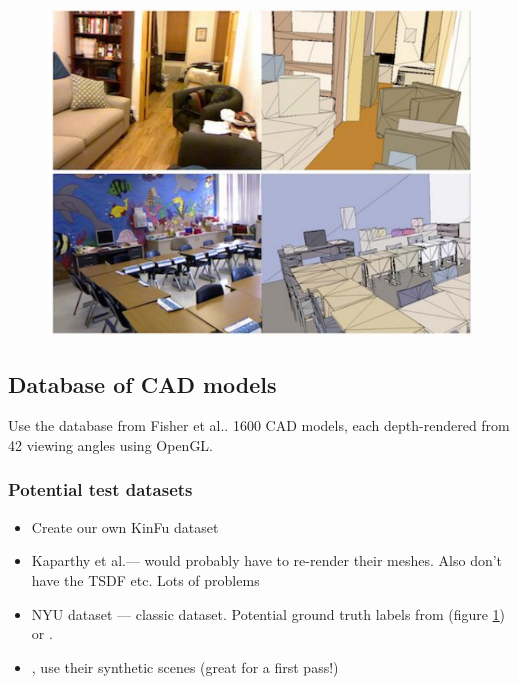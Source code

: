 \documentclass[10pt,twocolumn,letterpaper]{article}
\makeatletter
\newcommand*{\ea}{et al.\@\xspace}
\makeatother
\begin{document}
\begin{figure}
    \centering%
    \includegraphics[width=1.0\columnwidth]{guo.png}%
    \label{fig:guo_labels}%
\end{figure}



\subsection{Database of CAD models}
Use the database from Fisher \ea \cite{fisher-siggraphasia-2012}.
1600 CAD models, each depth-rendered from 42 viewing angles using OpenGL.

\subsubsection{Potential test datasets}
\begin{itemize}
\item Create our own KinFu dataset
\item Kaparthy \ea --- would probably have to re-render their meshes.
Also don't have the TSDF etc. Lots of problems
\item NYU dataset --- classic dataset. Potential ground truth labels from \cite{guo-iccv-2013} (figure \ref{fig:guo_labels}) or \cite{kim-iccv-2013}.
\item \cite{fisher-siggraphasia-2012}, use their synthetic scenes (great for a first pass!)
\end{itemize}
\end{document}
